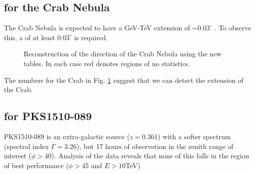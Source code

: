 \documentclass[main.tex]{subfiles}
\begin{document}
\subsection{\rse for the Crab Nebula}

The Crab Nebula is expected to have a GeV-TeV extension of $\sim 0.03^\circ$ \cite{Fermi_LAT_Crab_extension}\cite{HESS_Crab_extension}. To observe this, a \rse of at least $0.03^\circ$ is required.


\begin{figure}[H]
  \begin{center}
  \end{center}
  \caption[Crab direction reconstruction using Method5t.]{Reconstruction of the direction of the Crab Nebula using the new \disp tables. In each case red denotes regions of no statistics.}
  \label{fig:crab_disp}
\end{figure}

The numbers for the Crab in Fig. \ref{fig:crab_disp} suggest that we can detect the extension of the Crab.

\subsection{\rse for PKS1510-089}
PKS1510-089 is an extra-galactic source ($z=0.361$) with a softer spectrum (spectral index $\Gamma=3.26$), but 17 hours of observation in the zenith range of interest ($\phi>40$). Analysis of the data reveals that none of this falls in the region of best performance ($\phi>45$ and $E>10$TeV)
\end{document}
